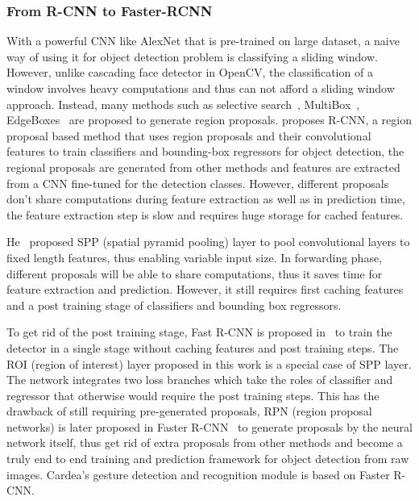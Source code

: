 \subsubsection{From R-CNN to Faster-RCNN}

With a powerful CNN like AlexNet that is pre-trained on large dataset, a naive way of using it for object detection problem is classifying a sliding window. However, unlike cascading face detector in OpenCV, the classification of a window involves heavy computations and thus can not afford a sliding window approach. Instead, many methods such as selective search~\cite{uijlings2013selective}, MultiBox~\cite{erhan2014scalable}, EdgeBoxes~\cite{zitnick2014edge} are proposed to generate region proposals. \cite{girshick2014rich} proposes R-CNN, a region proposal based method that uses region proposals and their convolutional features to train classifiers and bounding-box regressors for object detection, the regional proposals are generated from other methods and features are extracted from a CNN fine-tuned for the detection classes. However, different proposals don't share computations during feature extraction as well as in prediction time, the feature extraction step is slow and requires huge storage for cached features.

He~\cite{he2014spatial} proposed SPP (spatial pyramid pooling) layer to pool convolutional layers to fixed length features, thus enabling variable input size. In forwarding phase, different proposals will be able to share computations, thus it saves time for feature extraction and prediction. However, it still requires first caching features and a post training stage of classifiers and bounding box regressors.

To get rid of the post training stage, Fast R-CNN is proposed in~\cite{girshick2015fast} to train the detector in a single stage without caching features and post training steps. The ROI (region of interest) layer proposed in this work is a special case of SPP layer. The network integrates two loss branches which take the roles of classifier and regressor that otherwise would require the post training steps. This has the drawback of still requiring pre-generated proposals, RPN (region proposal networks) is later proposed in Faster R-CNN~\cite{ren2015faster} to generate proposals by the neural network itself, thus get rid of extra proposals from other methods and become a truly end to end training and prediction framework for object detection from raw images. Cardea's gesture detection and recognition module is based on Faster R-CNN.


\newpage
